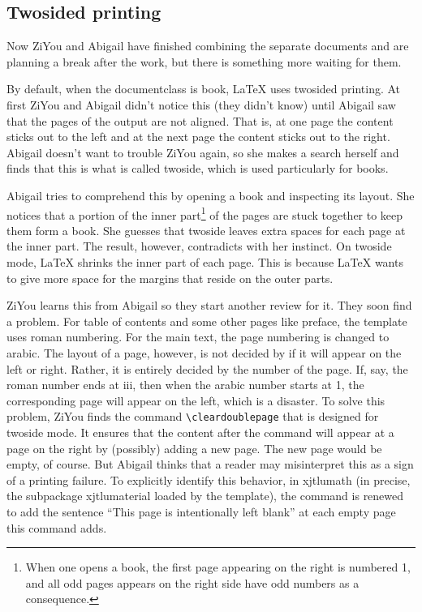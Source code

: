 \subsection{Twosided printing}
Now ZiYou and Abigail have finished combining the separate documents and are planning a break after the work, but there is something more waiting for them.

By default, when the documentclass is book, \LaTeX{} uses twosided printing. At first ZiYou and Abigail didn't notice this (they didn't know) until Abigail saw that the pages of the output are not aligned. That is, at one page the content sticks out to the left and at the next page the content sticks out to the right. Abigail doesn't want to trouble ZiYou again, so she makes a search herself and finds that this is what is called twoside, which is used particularly for books.

Abigail tries to comprehend this by opening a book and inspecting its layout. She notices that a portion of the inner part\footnote{When one opens a book, the first page appearing on the right is numbered 1, and all odd pages appears on the right side have odd numbers as a consequence.} of the pages are stuck together to keep them form a book. She guesses that twoside leaves extra spaces for each page at the inner part. The result, however, contradicts with her instinct. On twoside mode, \LaTeX{} shrinks the inner part of each page. This is because \LaTeX{} wants to give more space for the margins that reside on the outer parts.

ZiYou learns this from Abigail so they start another review for it. They soon find a problem. For table of contents and some other pages like preface, the template uses roman numbering. For the main text, the page numbering is changed to arabic. The layout of a page, however, is not decided by if it will appear on the left or right. Rather, it is entirely decided by the number of the page. If, say, the roman number ends at iii, then when the arabic number starts at 1, the corresponding page will appear on the left, which is a disaster. To solve this problem, ZiYou finds the command \verb=\cleardoublepage= that is designed for twoside mode. It ensures that the content after the command will appear at a page on the right by (possibly) adding a new page. The new page would be empty, of course. But Abigail thinks that a reader may misinterpret this as a sign of a printing failure. To explicitly identify this behavior, in xjtlumath (in precise, the subpackage xjtlumaterial loaded by the template), the command is renewed to add the sentence ``This page is intentionally left blank'' at each empty page this command adds.

